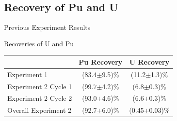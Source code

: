\documentclass{beamer}
\begin{document}
\subsection{Recovery of Pu and U}
\begin{frame}{Previous Experiment Results}
  \begin{block}{Recoveries of U and Pu}
    \begin{center}
      \vskip -0.2cm
  \begin{tabular}{l  c  c}\toprule
                & Pu Recovery & U Recovery \\ \midrule \vspace{0.1cm}
   Experiment 1         & (83.4$\pm$9.5)\% & (11.2$\pm$1.3)\% \\
   Experiment 2 Cycle 1 & (99.7$\pm$4.2)\% & (6.8$\pm$0.3)\% \\
   Experiment 2 Cycle 2 & (93.0$\pm$4.6)\% & (6.6$\pm$0.3)\% \\
   Overall Experiment 2 & (92.7$\pm$6.0)\% & (0.45$\pm$0.03)\% \\ \bottomrule
  \end{tabular}
  \end{center}
  \end{block}
\end{frame}
\end{document}

